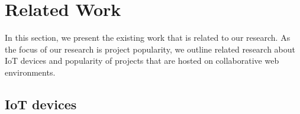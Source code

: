 \section{Related Work}\label{section:relatedWork}

In this section, we present the existing work that is related to our research.
As the focus of our research is project popularity, we outline related research about IoT devices and popularity of projects that are hosted on collaborative web environments.

\subsection{IoT devices}


